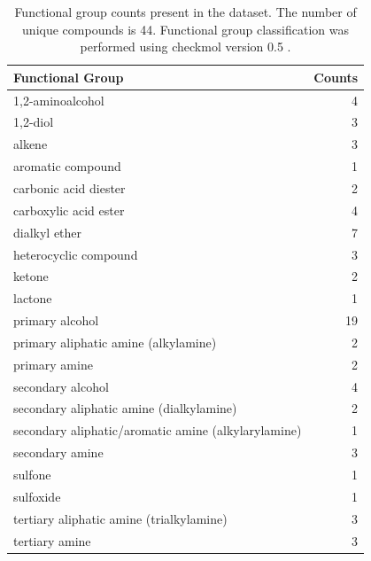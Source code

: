 \documentclass[journal=jacsat,manuscript=article]{achemso}
\begin{document}
\begin{table}
\begin{tabular}{lr}
\toprule
Functional Group &    Counts \\
\midrule
1,2-aminoalcohol                                    &   4 \\
1,2-diol                                            &   3 \\
alkene                                              &   3 \\
aromatic compound                                   &   1 \\
carbonic acid diester                               &   2 \\
carboxylic acid ester                               &   4 \\
dialkyl ether                                       &   7 \\
heterocyclic compound                               &   3 \\
ketone                                              &   2 \\
lactone                                             &   1 \\
primary alcohol                                     &  19 \\
primary aliphatic amine (alkylamine)                &   2 \\
primary amine                                       &   2 \\
secondary alcohol                                   &   4 \\
secondary aliphatic amine (dialkylamine)            &   2 \\
secondary aliphatic/aromatic amine (alkylarylamine) &   1 \\
secondary amine                                     &   3 \\
sulfone                                             &   1 \\
sulfoxide                                           &   1 \\
tertiary aliphatic amine (trialkylamine)            &   3 \\
tertiary amine                                      &   3 \\
\bottomrule
\end{tabular}
\caption{Functional group counts present in the dataset.  The number of unique compounds is 44.  Functional group classification was performed using checkmol version 0.5 \cite{haider2010functionality}.}
\label{table:FunctionalGroups}
\end{table}
\end{document}
